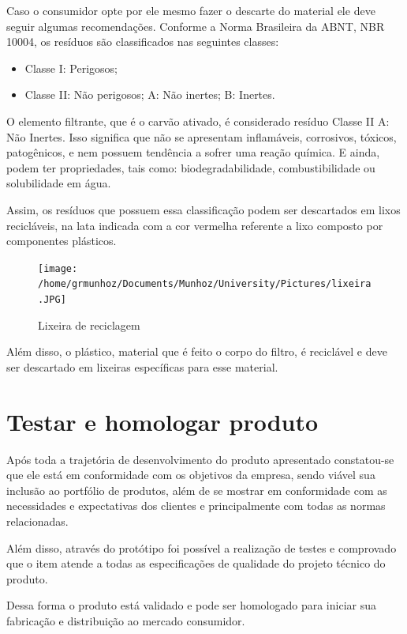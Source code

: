 \documentclass[
	12pt,				%
	openright,			%
	oneside,			%
	a4paper,			%
	english,			%
	french,				%
	spanish,			%
	brazil				%
	]{abntex2}
\begin{document}
Caso o consumidor opte por ele mesmo fazer o descarte do material ele deve seguir algumas recomendações. Conforme a Norma Brasileira da ABNT, NBR 10004, os resíduos são classificados nas seguintes classes:

\begin{itemize}
\item Classe I: Perigosos;
\item Classe II: Não perigosos;
\subitem A: Não inertes;
\subitem B: Inertes.
\end{itemize}

O elemento filtrante, que é o carvão ativado, é considerado resíduo Classe II A: Não Inertes. Isso significa que não se apresentam inflamáveis, corrosivos, tóxicos, patogênicos, e nem possuem tendência a sofrer uma reação química. E ainda, podem ter propriedades, tais como: biodegradabilidade, combustibilidade ou solubilidade em água.

Assim, os resíduos que possuem essa classificação podem ser descartados em lixos recicláveis, na lata indicada com a cor vermelha referente a lixo composto por componentes plásticos.

\begin{figure}[H]
\begin{center}
\caption{Lixeira de reciclagem}
\texttt{[image: /home/grmunhoz/Documents/Munhoz/University/Pictures/lixeira.JPG]} 
\label{figetapas}
\end{center}
\end{figure}

Além disso, o plástico, material que é feito o corpo do filtro, é reciclável e deve ser descartado em lixeiras específicas para esse material.

\section{Testar e homologar produto}

Após toda a trajetória de desenvolvimento do produto apresentado constatou-se que ele está em conformidade com os objetivos da empresa, sendo viável sua inclusão ao portfólio de produtos, além de se mostrar em conformidade com as necessidades e expectativas dos clientes e principalmente com todas as normas relacionadas.

Além disso, através do protótipo foi possível a realização de testes e comprovado que o item atende a todas as especificações de qualidade do projeto técnico do produto.

Dessa forma o produto está validado e pode ser homologado para iniciar sua fabricação e distribuição ao mercado consumidor.
\end{document}
